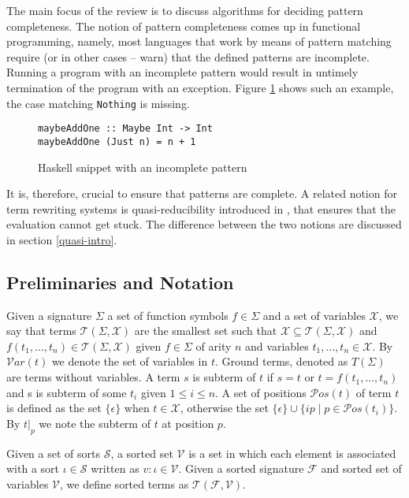 The main focus of the review is to discuss algorithms for deciding pattern completeness. The notion of pattern completeness comes up in functional programming, namely, most languages that work by means of pattern matching require (or in other cases – warn) that the defined patterns are incomplete. Running a program with an incomplete pattern would result in untimely termination of the program with an exception. Figure \ref{fig:haskell-incomplete} shows such an example, the case matching \texttt{Nothing} is missing.

\begin{figure}[!ht]
\centering
\begin{verbatim}
maybeAddOne :: Maybe Int -> Int
maybeAddOne (Just n) = n + 1
\end{verbatim}
    \caption{Haskell snippet with an incomplete pattern}
    \label{fig:haskell-incomplete}
\end{figure}

It is, therefore, crucial to ensure that patterns are complete. A related notion for term rewriting systems is quasi-reducibility introduced in \cite{kapur}, that ensures that the evaluation cannot get stuck. The difference between the two notions are discussed in section \ref{quasi-intro}.

\subsection{Preliminaries and Notation}
Given a signature $\Sigma$ a set of function symbols $f \in \Sigma$ and a set of variables $\mathcal{X}$, we say that terms $\mathcal{T}(\Sigma, \mathcal{X})$ are the smallest set such that $\mathcal{X} \subseteq \mathcal{T}(\Sigma, \mathcal{X})$ and $f(t_1, ..., t_n) \in \mathcal{T}(\Sigma, \mathcal{X})$ given $f \in \Sigma$ of arity $n$ and variables $t_1, ..., t_n \in \mathcal{X}$. By $\mathcal{V}ar(t)$ we denote the set of variables in $t$. Ground terms, denoted as $T(\Sigma)$ are terms without variables. A term $s$ is subterm of $t$ if $s = t$ or $t = f(t_1, ..., t_n)$ and s is subterm of some $t_i$ given $1 \leq i \leq n$. A set of positions $\mathcal{P}os(t)$ of term $t$ is defined as the set $\{\epsilon\}$ when $t \in \mathcal{X}$, otherwise the set $\{\epsilon\} \cup \{ip \mid p \in \mathcal{P}os(t_i)\}$. By $t|_p$ we note the subterm of $t$ at position $p$.

Given a set of sorts $\mathcal{S}$, a sorted set $\mathcal{V}$ is a set in which each element is associated with a sort $\iota \in \mathcal{S}$ written as $v : \iota \in \mathcal{V}$. Given a sorted signature $\mathcal{F}$ and sorted set of variables $\mathcal{V}$, we define sorted terms as $\mathcal{T}(\mathcal{F}, \mathcal{V})$. 

